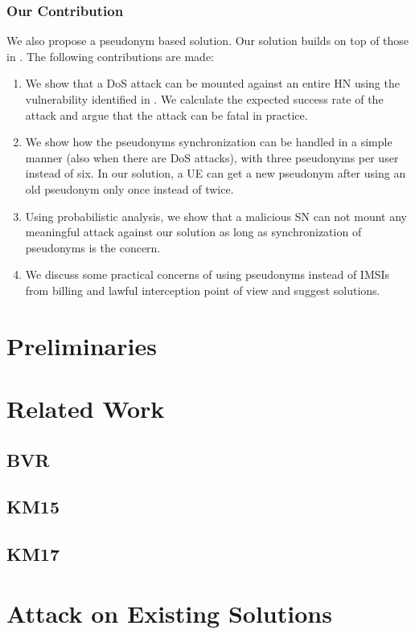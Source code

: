 \documentclass{llncs} %
\begin{document}
\subsubsection{Our Contribution}
We also propose a pseudonym based solution. Our solution builds on top of those in \cite{CCS15,SSR15,wisec17}. The following contributions are made:
\begin{enumerate}
\item We show that a DoS attack can be mounted against an entire HN using the vulnerability identified in \cite{wisec17}. We calculate the expected success rate of the attack and argue that the attack can be fatal in practice. 
\item We show how the pseudonyms synchronization can be handled in a simple manner (also when there are DoS attacks), with three pseudonyms per user instead of six. In our solution, a UE can get a new pseudonym after using an old pseudonym only once instead of twice.
\item Using probabilistic analysis, we show that a malicious SN can not mount any meaningful attack against our solution as long as synchronization of pseudonyms is the concern.
\item We discuss some practical concerns of using pseudonyms instead of IMSIs from billing and lawful interception point of view and suggest solutions.
\end{enumerate}




\section{Preliminaries}

\section{Related Work}
\subsection{BVR}
\subsection{KM15}
\subsection{KM17}

\section{Attack on Existing Solutions}
\end{document}
